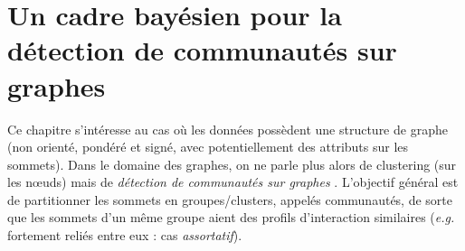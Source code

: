 \chapter{Un cadre bayésien pour la détection de communautés sur graphes}
\label{chap:bayes_clusters_graphes}



\usetikzlibrary{fit,backgrounds,shapes.geometric,patterns,decorations.pathreplacing}


\newcommand{\ChapTriangleIcon}[2][1.65ex]{%
  \begingroup
  \pgfmathsetlengthmacro{\TriangleH}{#1}%
  \tikz[
    baseline=-0.25ex,
    x=\TriangleH,
    y=\TriangleH,
    line cap=round,
    line join=round
  ]{%
    \path[use as bounding box]
      (-0.08,-0.12) rectangle (1.24,1.12);

    \draw[#2]
      (0,0)
      --
      (1.1547,0)
      --
      (0.57735,1)
      --
      cycle;
  }%
  \endgroup
}

\DeclareRobustCommand{\TriangleAttractif}[1][2.5ex]{%
  \ChapTriangleIcon[#1]{posedge}%
}

\DeclareRobustCommand{\TriangleRepulsif}[1][2.5ex]{%
  \ChapTriangleIcon[#1]{negedge}%
}


Ce chapitre s'intéresse au cas où les données possèdent une structure de graphe (non orienté, pondéré et signé, avec potentiellement des attributs sur les sommets). 
Dans le domaine des graphes, on ne parle plus alors de clustering (sur les nœuds) mais de \emph{détection de communautés sur graphes} \cite{Fortunato2010}. L'objectif général est de partitionner les sommets en groupes/clusters, appelés communautés, de sorte que les sommets d'un même groupe aient des profils d'interaction similaires (\emph{e.g.} fortement reliés entre eux : cas \emph{assortatif}).

